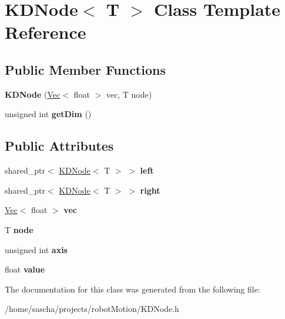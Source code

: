 \hypertarget{class_k_d_node}{\section{K\-D\-Node$<$ T $>$ Class Template Reference}
\label{class_k_d_node}
}
\subsection*{Public Member Functions}
\begin{DoxyCompactItemize}
\item 
\hypertarget{class_k_d_node_aabf86d2924f766614ace111d9a53ecfa}{{\bfseries K\-D\-Node} (\hyperlink{class_vec}{Vec}$<$ float $>$ vec, T node)}\label{class_k_d_node_aabf86d2924f766614ace111d9a53ecfa}

\item 
\hypertarget{class_k_d_node_a1ac781bf115cbf04efbbed454380aecd}{unsigned int {\bfseries get\-Dim} ()}\label{class_k_d_node_a1ac781bf115cbf04efbbed454380aecd}

\end{DoxyCompactItemize}
\subsection*{Public Attributes}
\begin{DoxyCompactItemize}
\item 
\hypertarget{class_k_d_node_a94881ffe0dd95156b2133018b85bbcaa}{shared\-\_\-ptr$<$ \hyperlink{class_k_d_node}{K\-D\-Node}$<$ T $>$ $>$ {\bfseries left}}\label{class_k_d_node_a94881ffe0dd95156b2133018b85bbcaa}

\item 
\hypertarget{class_k_d_node_ae106838287579f75482df66f7ff14966}{shared\-\_\-ptr$<$ \hyperlink{class_k_d_node}{K\-D\-Node}$<$ T $>$ $>$ {\bfseries right}}\label{class_k_d_node_ae106838287579f75482df66f7ff14966}

\item 
\hypertarget{class_k_d_node_a777fcb67ca9c34d4b7c45f425553838e}{\hyperlink{class_vec}{Vec}$<$ float $>$ {\bfseries vec}}\label{class_k_d_node_a777fcb67ca9c34d4b7c45f425553838e}

\item 
\hypertarget{class_k_d_node_a7f2c9cf487713c6609b9cbbfde328c2e}{T {\bfseries node}}\label{class_k_d_node_a7f2c9cf487713c6609b9cbbfde328c2e}

\item 
\hypertarget{class_k_d_node_a6ca4fb228029fce541b831d69f1a24a5}{unsigned int {\bfseries axis}}\label{class_k_d_node_a6ca4fb228029fce541b831d69f1a24a5}

\item 
\hypertarget{class_k_d_node_a1aef17959c9bf85c36c4180345828cb4}{float {\bfseries value}}\label{class_k_d_node_a1aef17959c9bf85c36c4180345828cb4}

\end{DoxyCompactItemize}


The documentation for this class was generated from the following file\-:\begin{DoxyCompactItemize}
\item 
/home/sascha/projects/robot\-Motion/K\-D\-Node.\-h\end{DoxyCompactItemize}
